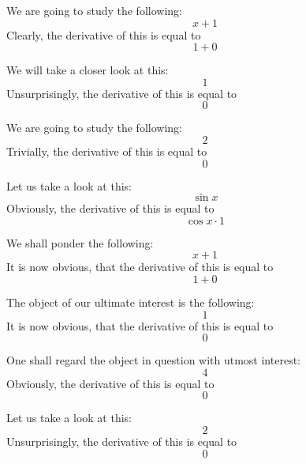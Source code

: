 \documentclass{article}
\begin{document}
We are going to study the following:
\begin{equation}
x + 1 
\end{equation}
Clearly, the derivative of this is equal to
\begin{equation}
1 + 0 
\end{equation}

We will take a closer look at this:
\begin{equation}
1 
\end{equation}
Unsurprisingly, the derivative of this is equal to
\begin{equation}
0 
\end{equation}

We are going to study the following:
\begin{equation}
2 
\end{equation}
Trivially, the derivative of this is equal to
\begin{equation}
0 
\end{equation}

Let us take a look at this:
\begin{equation}
\sin x 
\end{equation}
Obviously, the derivative of this is equal to
\begin{equation}
\cos x \cdot 1 
\end{equation}

We shall ponder the following:
\begin{equation}
x + 1 
\end{equation}
It is now obvious, that the derivative of this is equal to
\begin{equation}
1 + 0 
\end{equation}

The object of our ultimate interest is the following:
\begin{equation}
1 
\end{equation}
It is now obvious, that the derivative of this is equal to
\begin{equation}
0 
\end{equation}

One shall regard the object in question with utmost interest:
\begin{equation}
4 
\end{equation}
Obviously, the derivative of this is equal to
\begin{equation}
0 
\end{equation}

Let us take a look at this:
\begin{equation}
2 
\end{equation}
Unsurprisingly, the derivative of this is equal to
\begin{equation}
0 
\end{equation}
\end{document}
